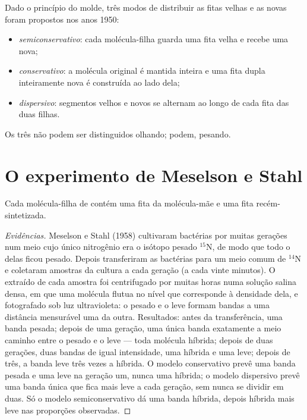 \begin{example}\label{ex:g11:dna-replication:models}
Dado o princípio do molde, três modos de distribuir as fitas velhas e
as novas foram propostos nos anos 1950:
\begin{itemize}
  \item \emph{semiconservativo}: cada molécula-filha guarda uma fita
        velha e recebe uma nova;
  \item \emph{conservativo}: a molécula original é mantida inteira e
        uma fita dupla inteiramente nova é construída ao lado dela;
  \item \emph{dispersivo}: segmentos velhos e novos se alternam ao
        longo de cada fita das duas filhas.
\end{itemize}
Os três não podem ser distinguidos olhando; podem, pesando.
\end{example}

\section{O experimento de Meselson e Stahl}

\begin{proposition}\label{prop:g11:dna-replication:semiconservative}
Cada molécula-filha de  contém uma fita da molécula-mãe e uma fita
recém-sintetizada.
\end{proposition}
\begin{proof}[Evidências]
Meselson e Stahl (1958) cultivaram bactérias por muitas gerações num
meio cujo único nitrogênio era o isótopo pesado $^{15}$N, de modo que
todo o  delas ficou pesado. Depois transferiram as bactérias para um
meio comum de $^{14}$N e coletaram amostras da cultura a cada geração
(a cada vinte minutos). O  extraído de cada amostra foi centrifugado
por muitas horas numa solução salina densa, em que uma molécula flutua
no nível que corresponde à densidade dela, e fotografado sob luz
ultravioleta: o  pesado e o leve formam bandas a uma distância
mensurável uma da outra. Resultados: antes da transferência, uma banda
pesada; depois de uma geração, uma única banda exatamente a meio
caminho entre o pesado e o leve --- toda molécula híbrida; depois de
duas gerações, duas bandas de igual intensidade, uma híbrida e uma
leve; depois de três, a banda leve três vezes a híbrida. O modelo
conservativo prevê uma banda pesada e uma leve na geração um, nunca uma
híbrida; o modelo dispersivo prevê uma banda única que fica mais leve a
cada geração, sem nunca se dividir em duas. Só o modelo
semiconservativo dá uma banda híbrida, depois híbrida mais leve nas
proporções observadas.
\end{proof}

